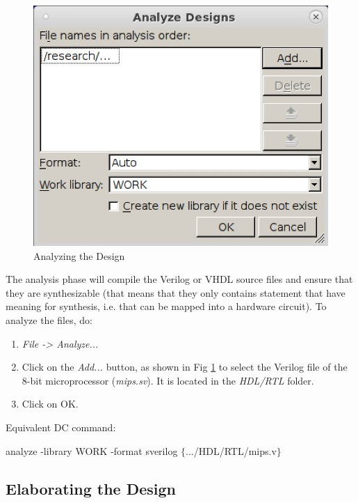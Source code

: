 	\parbox[t]{\dimexpr\textwidth-\leftmargin}{%
	\begin{figure}
		\vspace{-6mm}
		\centering
		\vspace{-\baselineskip}
 		\includegraphics[scale=0.5]{figures/lab3_design_compiler/analyze_dc}
\caption{Analyzing the Design}
\label{fig_analyze_dc}
	\end{figure}
	The analysis phase will compile the Verilog or VHDL source files and ensure that they are synthesizable (that means that they only contains statement that have meaning for synthesis, i.e. that can be mapped into a hardware circuit). To analyze the files, do:
	 \begin{enumerate}
		\item \textit {File -> Analyze...}
		\item Click on the \textit{Add...} button, as shown in Fig \ref{fig_analyze_dc} to select the Verilog file of the 8-bit microprocessor (\textit{mips.sv}). It is located in the \textit{HDL/RTL} folder.
		\item Click on OK.	
	\end{enumerate}
}

Equivalent DC command:
	\begin{codeline}
	analyze -library WORK -format sverilog $\{$.../HDL/RTL/mips.v$\}$
\end{codeline}

\subsection{Elaborating the Design}

